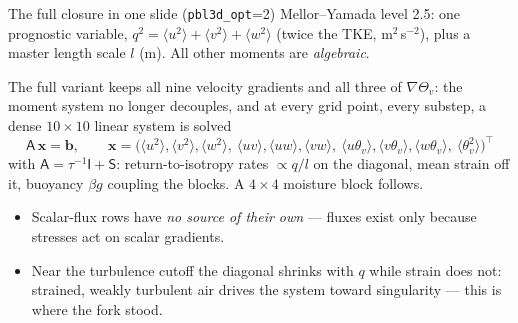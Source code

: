 \documentclass[10pt,aspectratio=169]{beamer}
\newcommand{\avg}[1]{\langle #1 \rangle}
\begin{document}
\begin{frame}{The full closure in one slide (\texttt{pbl3d\_opt}=2)}
  Mellor--Yamada level 2.5: one prognostic variable,
  $q^2 = \avg{u^2}+\avg{v^2}+\avg{w^2}$ (twice the TKE, m$^2$\,s$^{-2}$),
  plus a master length scale $l$ (m). All other moments are \emph{algebraic}.
  \vspace{1ex}

  The full variant keeps all nine velocity gradients and all three of
  $\nabla\Theta_v$: the moment system no longer decouples, and at every grid
  point, every substep, a dense $10\times10$ linear system is solved
  \[
    \mathsf{A}\,\mathbf{x} = \mathbf{b},
    \qquad
    \mathbf{x} = \big(\avg{u^2},\avg{v^2},\avg{w^2},\ \avg{uv},\avg{uw},\avg{vw},\
    \avg{u\theta_v},\avg{v\theta_v},\avg{w\theta_v},\ \avg{\theta_v^2}\big)^{\!\top}
  \]
  with $\mathsf{A} = \tau^{-1}\mathsf{I} + \mathsf{S}$: return-to-isotropy rates
  $\propto q/l$ on the diagonal, mean strain off it, buoyancy $\beta g$ coupling
  the blocks. A $4\times4$ moisture block follows.
  \vspace{1ex}
  \begin{itemize}
    \item Scalar-flux rows have \emph{no source of their own} --- fluxes exist
      only because stresses act on scalar gradients.
    \item Near the turbulence cutoff the diagonal shrinks with $q$ while strain
      does not: strained, weakly turbulent air drives the system toward
      singularity --- this is where the fork stood.
  \end{itemize}
\end{frame}
\end{document}
